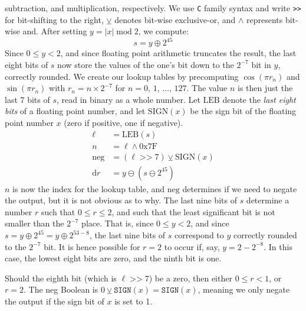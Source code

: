 \documentclass{article}
\theoremstyle{plain}
\begin{document}
        subtraction, and multiplication, respectively. We use \texttt{C} family
        syntax and write \texttt{>>} for bit-shifting to the right,
        $\veebar$ denotes bit-wise exclusive-or, and
        $\land$ represents bit-wise and.
        After setting $y=|x|\;\textrm{mod}\;2$, we compute:
        \begin{equation}
            s=y\oplus{2}^{45}
        \end{equation}
        Since $0\leq{y}<2$, and since floating point arithmetic truncates the
        result, the last eight bits of $s$ now store the values of the one's bit
        down to the $2^{-7}$ bit in $y$, correctly rounded. We create our
        lookup tables by precomputing $\cos(\pi{r}_{n})$ and
        $\sin(\pi{r}_{n})$ with $r_{n}=n\times2^{-7}$ for
        $n=0,\,1,\,\dots,\,127$. The value $n$ is then just the last 7 bits of
        $s$, read in binary as a whole number. Let $\textrm{LEB}$ denote the
        \textit{last eight bits} of a floating point number, and let
        $\textrm{SIGN}(x)$ be the sign bit of the floating point number $x$
        (zero if positive, one if negative).
        \begin{align}
            \ell&=\textrm{LEB}(s)\\
            n&=\ell\land\textrm{0x7F}\\
            \textrm{neg}&=(\ell\;\texttt{>>}\;7)\veebar\textrm{SIGN}(x)\\
            \textrm{d}r&=y\ominus(s\ominus2^{45})
        \end{align}
        $n$ is now the index for the lookup table, and $\textrm{neg}$ determines
        if we need to negate the output, but it is not obvious as to why.
        The last nine bits of $s$ determine a number $r$ such that
        $0\leq{r}\leq{2}$, and such that the least significant bit is not
        smaller than the $2^{-7}$ place. That is, since $0\leq{y}<2$, and since
        $s=y\oplus{2}^{45}=y\oplus{2}^{53-8}$, the last nine bits of $s$
        correspond to $y$ correctly rounded to the $2^{-7}$ bit. It is hence
        possible for $r=2$ to occur if, say, $y=2-2^{-8}$. In this case, the
        lowest eight bits are zero, and the ninth bit is one.
        \par\hfill\par
        Should the eighth bit (which is $\ell\;\texttt{>>}\;7$)
        be a zero, then either $0\leq{r}<1$, or $r=2$.
        The \textrm{neg} Boolean is $0\veebar\texttt{SIGN}(x)=\texttt{SIGN}(x)$,
        meaning we only negate the output if the sign bit of $x$ is set to 1.
\end{document}
